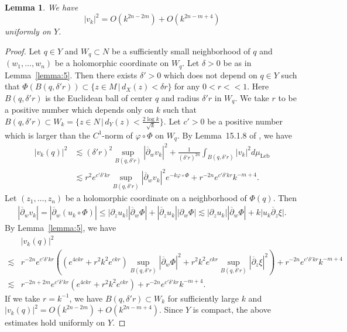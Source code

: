 \documentclass[12pt,oneside]{amsart}
\theoremstyle{plain}
\newtheorem{lemma}{Lemma}
\theoremstyle{definition}
\theoremstyle{remark}
\begin{document}
\begin{lemma}\label{lemma:6}
We have 
\[
|v_{k}|^2 = O(k^{2n-2m}) + O(k^{2n-m+4})
\]
uniformly on $Y$.  
\end{lemma}
\begin{proof}
Let $q \in Y$ and $W_q \subset N$ be a sufficiently small neighborhood of $q$ and $(w_{1}, \ldots, w_{n})$ be a holomorphic coordinate on $W_q$.  
Let $\delta > 0$ be as in Lemma~\ref{lemma:5}.  
Then there exists $\delta' > 0$ which does not depend on $q \in Y$ such that $\Phi (B(q, \delta' r)) \subset \{z \in M\, |\, d_{X}(z) < \delta r\}$ for any $0 < r << 1$.  
Here $B(q, \delta'r)$ is the Euclidean ball of center $q$ and radius $\delta' r$ in $W_q$.  
We take $r$ to be a positive number which depends only on $k$ such that $B(q, \delta'r) \subset W_{k} = \{z \in N \,|\, d_{Y}(z) < \frac{2\log k}{\sqrt{k}}\}$.  
Let $c' > 0$ be a positive number which is larger than the $C^1$-norm of $\varphi \circ \Phi$ on $W_q$.  
By Lemma~15.1.8 of \cite{Hor}, we have 
\begin{align*}
|v_{k}(q)|^2 &\lesssim (\delta' r)^2 \sup_{B(q, \delta'r)} |\overline{\partial}_{w} v_{k}|^2 + \frac{1}{(\delta'r)^{2n}} \int_{B(q, \delta'r)} |v_{k}|^2 d\mu_{\mathrm{Leb}} \\
& \lesssim r^2 e^{c'\delta'kr} \sup_{B(q, \delta' r)} |\overline{\partial}_{w}v_{k}|^2e^{-k\varphi \circ \Phi} + r^{-2n}e^{c'\delta'kr} k^{-m+4}.  
\end{align*}
Let $(z_{1}, \ldots, z_{n})$ be a holomorphic coordinate on a neighborhood of $\Phi (q)$.  
Then 
\begin{align*}
|\overline{\partial}_{w}v_{k}| = |\overline{\partial}_{w}(u_{k} \circ \Phi)| \leq |\partial_{z} u_{k}| |\overline{\partial}_{w} \Phi| + |\overline{\partial}_{z} u_{k}| |\partial_{w} \Phi| 
\lesssim 
|\partial_{z}u_{k}||\overline{\partial}_{w} \Phi| + k\big|u_{k}\overline{\partial}_{z}\xi\big|.  
\end{align*}
By Lemma~\ref{lemma:5}, we have 
\begin{align*}
& |v_{k}(q)|^2 \\
 \lesssim & r^{-2n} e^{c'\delta' kr} ((e^{4ckr} + r^2k^2 e^{ckr} )\sup_{B(q, \delta' r)}|\overline{\partial}_{w} \Phi|^2 + r^2k^2 e^{ckr}\sup_{B(q, \delta' r)}|\overline{\partial}_{z}\xi|^2 ) + r^{-2n}e^{c'\delta'kr}k^{-m+4} \\
\lesssim &
r^{-2n + 2m}e^{c'\delta' kr}  \left(e^{4ckr} + r^2k^2e^{ckr} \right) + r^{-2n} e^{c' \delta' kr} k^{-m+4}.  
\end{align*}
If we take $r = k^{-1}$, we have $B(q, \delta'r) \subset W_{k}$ for sufficiently large $k$ and 
$|v_{k}(q)|^2 = O(k^{2n-2m}) + O(k^{2n-m+4})$.  
Since $Y$ is compact, the above estimates hold uniformly on $Y$.  
\end{proof}
\end{document}
